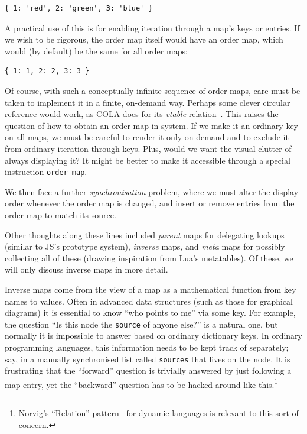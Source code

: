 \documentclass[ twoside,openright,titlepage,numbers=noenddot,headinclude,footinclude,cleardoublepage=empty,abstract=on,
                BCOR=5mm,paper=a4,fontsize=11pt
                ]{scrreprt}
\theoremstyle{definition}
\begin{document}
\begin{verbatim}
{ 1: 'red', 2: 'green', 3: 'blue' }
\end{verbatim}

A practical use of this is for enabling iteration through a map's keys
or entries. If we wish to be rigorous, the order map itself would have
an order map, which would (by default) be the same for all order maps:

\begin{verbatim}
{ 1: 1, 2: 2, 3: 3 }
\end{verbatim}

Of course, with such a conceptually infinite sequence of order maps,
care must be taken to implement it in a finite, on-demand way. Perhaps
some clever circular reference would work, as COLA does for its
\emph{vtable} relation~\parencite{OROM}. This raises the question of how
to obtain an order map in-system. If we make it an ordinary key on all
maps, we must be careful to render it only on-demand and to exclude it
from ordinary iteration through keys. Plus, would we want the visual
clutter of always displaying it? It might be better to make it
accessible through a special instruction \texttt{order-map}.

We then face a further \emph{synchronisation} problem, where we must
alter the display order whenever the order map is changed, and insert or
remove entries from the order map to match its source.

Other thoughts along these lines included \emph{parent} maps for
delegating lookups (similar to \ac{JS}'s prototype system),
\emph{inverse} maps, and \emph{meta} maps for possibly collecting all of
these (drawing inspiration from Lua's metatables). Of these, we will
only discuss inverse maps in more detail.

Inverse maps come from the view of a map as a mathematical function from
key names to values. Often in advanced data structures (such as those
for graphical diagrams) it is essential to know ``who points to me'' via
some key. For example, the question ``Is this node the \texttt{source}
of anyone else?'' is a natural one, but normally it is impossible to
answer based on ordinary dictionary keys. In ordinary programming
languages, this information needs to be kept track of separately; say,
in a manually synchronised list called \texttt{sources} that lives on
the node. It is frustrating that the ``forward'' question is trivially
answered by just following a map entry, yet the ``backward'' question
has to be hacked around like this.\footnote{Norvig's ``Relation''
  pattern~\parencite{DynPat} for dynamic languages is relevant to this
  sort of concern.}
\end{document}
